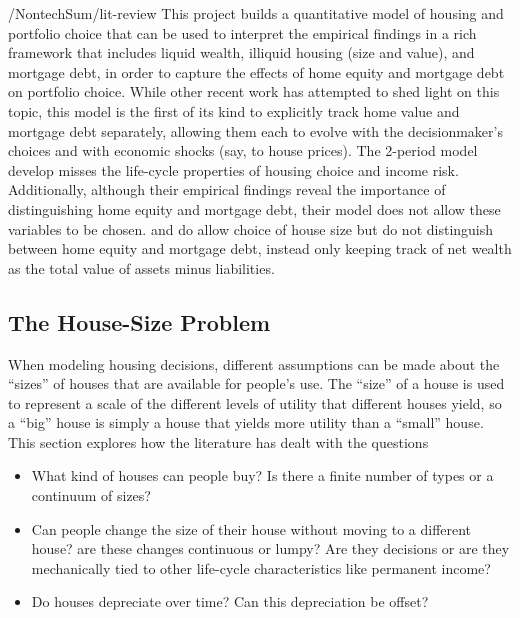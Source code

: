 \documentclass[PortfolioChoiceWithRiskyHousing]{subfiles}
\begin{document}
\begin{verbatimwrite}{\LaTeXOutput/NontechSum/lit-review}
  This project builds a quantitative model of housing and portfolio choice that can be used to interpret the empirical findings \cite{Chetty2017} in a rich framework that includes liquid wealth, illiquid housing (size and value), and mortgage debt, in order to capture the effects of home equity and mortgage debt on portfolio choice. While other recent work has attempted to shed light on this topic, this model is the first of its kind to explicitly track home value and mortgage debt separately, allowing them each to evolve with the decisionmaker's choices and with economic shocks (say, to house prices). The 2-period model \cite{Chetty2017} develop misses the life-cycle properties of housing choice and income risk. Additionally, although their empirical findings reveal the importance of distinguishing home equity and mortgage debt, their model does not allow these variables to be chosen. \cite{Cocco2004rfs} and \cite{yao2005optimal} do allow choice of house size but do not distinguish between home equity and mortgage debt, instead only keeping track of net wealth as the total value of assets minus liabilities.

\end{verbatimwrite}



\subsection{The House-Size Problem}

When modeling housing decisions, different assumptions can be made about the
``sizes'' of houses that are available for people's use. The ``size'' of
a house is used to represent a scale of the different levels of utility that
different houses yield, so a ``big'' house is simply a house that yields more
utility than a ``small'' house. This section explores how the literature has
dealt with the questions
\begin{itemize}
\item What kind of houses can people buy? Is there a finite number of types or a continuum of sizes?
\item Can people change the size of their house without moving to a different house?
  are these changes continuous or lumpy? Are they decisions or are they
  mechanically tied to other life-cycle characteristics like permanent income?
\item Do houses depreciate over time? Can this depreciation be offset?
\end{itemize}
\end{document}
